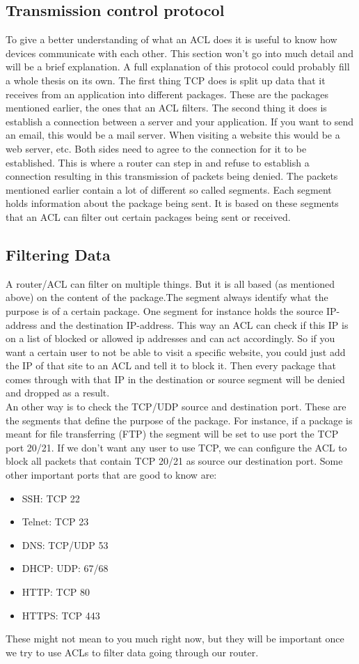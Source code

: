 \subsection{Transmission control protocol}
To give a better understanding of what an ACL does it is useful to know how devices communicate with each other. This section won't go into much detail and will be a brief explanation. A full explanation of this protocol could probably fill a whole thesis on its own.
The first thing TCP does is split up data that it receives from an application into different packages. These are the packages mentioned earlier, the ones that an ACL filters.
The second thing it does is establish a connection between a server and your application. If you want to send an email, this would be a mail server. When visiting a website this would be a web server, etc. Both sides need to agree to the connection for it to be established. This is where a router can step in and refuse to establish a connection resulting in this transmission of packets being denied.
The packets mentioned earlier contain a lot of different so called segments. Each segment holds information about the package being sent. It is based on these segments that an ACL can filter out certain packages being sent or received.
\subsection{Filtering Data}
A router/ACL can filter on multiple things. But it is all based (as mentioned above) on the content of the package.The segment always identify what the purpose is of a certain package. One segment for instance holds the source IP-address and the destination IP-address. This way an ACL can check if this IP is on a list of blocked or allowed ip addresses and can act accordingly. So if you want a certain user to not be able to visit a specific website, you could just add the IP of that site to an ACL and tell it to block it. Then every package that comes through with that IP in the destination or source segment will be denied and dropped as a result.\\
An other way is to check the TCP/UDP source and destination port. These are the segments that define the purpose of the package. For instance, if a package is meant for file transferring (FTP) the segment will be set to use port the TCP port 20/21. If we don't want any user to use TCP, we can configure the ACL to block all packets that contain TCP 20/21 as source our destination port. Some other important ports that are good to know are:
\begin{itemize}
\item SSH: TCP 22
\item Telnet: TCP 23
\item DNS: TCP/UDP 53
\item DHCP: UDP: 67/68
\item HTTP: TCP 80
\item HTTPS: TCP 443
\end{itemize}
 These might not mean to you much right now, but they will be important once we try to use ACLs to filter data going through our router.
